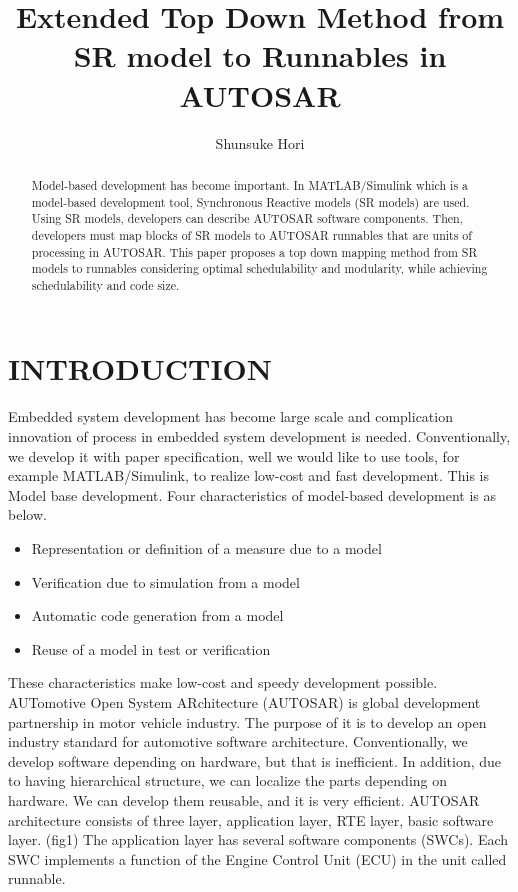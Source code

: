 \documentclass[conference,compsoc]{IEEEtran}
\title{Extended Top Down Method from SR model to Runnables in AUTOSAR}
\author{Shunsuke Hori}
\begin{document}
\maketitle

\begin{abstract}
 Model-based development has become important.
In MATLAB/Simulink which is a model-based development tool, Synchronous Reactive models (SR models) are used.
Using SR models, developers can describe AUTOSAR software components.
Then, developers must map blocks of SR models to AUTOSAR runnables that are units of processing in AUTOSAR.
This paper proposes a top down mapping method from SR models to runnables considering optimal schedulability and modularity, while achieving schedulability and code size.
\end{abstract}
	\section{INTRODUCTION}
 Embedded system development has become large scale and complication innovation of process in embedded system development is needed.
Conventionally, we develop it with paper specification, well we would like to use tools, for example MATLAB/Simulink, to realize low-cost and fast development.
This is Model base development.
Four characteristics of model-based development is as below.
	\begin{itemize}
		\item Representation or definition of a measure due to a model
		\item Verification due to simulation from a model
		\item Automatic code generation from a model
		\item Reuse of a model in test or verification
	\end{itemize} 
These characteristics make low-cost and speedy development possible.
 AUTomotive Open System ARchitecture (AUTOSAR) is global development partnership in motor vehicle industry.
The purpose of it is to develop an open industry standard for automotive software architecture.
Conventionally, we develop software depending on hardware, but that is inefficient.
In addition, due to having hierarchical structure, we can localize the parts depending on hardware.
We can develop them reusable, and it is very efficient. 
AUTOSAR architecture consists of three layer, application layer, RTE layer, basic software layer. (fig1)
 The application layer has several software components (SWCs).
Each SWC implements a function of the Engine Control Unit (ECU) in the unit called runnable.
\end{document}
